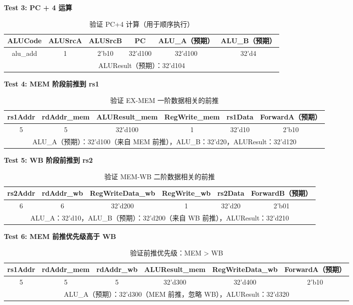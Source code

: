 \documentclass[12pt,a4paper]{article}
\begin{document}
\textbf{Test 3: PC + 4 运算}

\begin{table}[H]
\centering
\begin{tabular}{|c|c|c|c|c|c|}
\hline
ALUCode & ALUSrcA & ALUSrcB & PC & ALU\_A（预期） & ALU\_B（预期） \\ \hline
alu\_add & 1 & 2'b10 & 32'd100 & 32'd100 & 32'd4 \\ \hline
\multicolumn{6}{|c|}{ALUResult（预期）：32'd104} \\ \hline
\end{tabular}
\caption{验证 PC+4 计算（用于顺序执行）}
\end{table}

\textbf{Test 4: MEM 阶段前推到 rs1}

\begin{table}[H]
\centering
\begin{tabular}{|c|c|c|c|c|c|}
\hline
rs1Addr & rdAddr\_mem & ALUResult\_mem & RegWrite\_mem & rs1Data & ForwardA（预期） \\ \hline
5 & 5 & 32'd100 & 1 & 32'd10 & 2'b10 \\ \hline
\multicolumn{6}{|c|}{ALU\_A（预期）：32'd100（来自 MEM 前推），ALU\_B：32'd20，ALUResult：32'd120} \\ \hline
\end{tabular}
\caption{验证 EX-MEM 一阶数据相关的前推}
\end{table}

\textbf{Test 5: WB 阶段前推到 rs2}

\begin{table}[H]
\centering
\begin{tabular}{|c|c|c|c|c|c|}
\hline
rs2Addr & rdAddr\_wb & RegWriteData\_wb & RegWrite\_wb & rs2Data & ForwardB（预期） \\ \hline
6 & 6 & 32'd200 & 1 & 32'd20 & 2'b01 \\ \hline
\multicolumn{6}{|c|}{ALU\_A：32'd10，ALU\_B（预期）：32'd200（来自 WB 前推），ALUResult：32'd210} \\ \hline
\end{tabular}
\caption{验证 MEM-WB 二阶数据相关的前推}
\end{table}

\textbf{Test 6: MEM 前推优先级高于 WB}

\begin{table}[H]
\centering
\begin{tabular}{|c|c|c|c|c|c|}
\hline
rs1Addr & rdAddr\_mem & rdAddr\_wb & ALUResult\_mem & RegWriteData\_wb & ForwardA（预期） \\ \hline
5 & 5 & 5 & 32'd300 & 32'd400 & 2'b10 \\ \hline
\multicolumn{6}{|c|}{ALU\_A（预期）：32'd300（MEM 前推，忽略 WB），ALUResult：32'd320} \\ \hline
\end{tabular}
\caption{验证前推优先级：MEM > WB}
\end{table}
\end{document}
